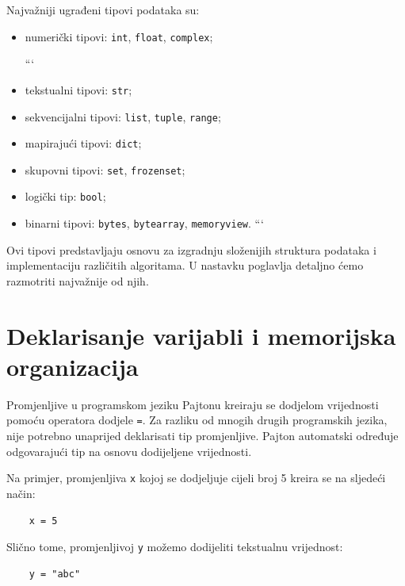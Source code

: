 Najvažniji ugrađeni tipovi podataka su:

\begin{itemize}
	\item numerički tipovi: \texttt{int}, \texttt{float}, \texttt{complex};
	
	```
	\item tekstualni tipovi: \texttt{str};
	
	\item sekvencijalni tipovi: \texttt{list}, \texttt{tuple}, \texttt{range};
	
	\item mapirajući tipovi: \texttt{dict};
	
	\item skupovni tipovi: \texttt{set}, \texttt{frozenset};
	
	\item logički tip: \texttt{bool};
	
	\item binarni tipovi: \texttt{bytes}, \texttt{bytearray}, \texttt{memoryview}.
	```
	
\end{itemize}

Ovi tipovi predstavljaju osnovu za izgradnju složenijih struktura podataka i implementaciju različitih algoritama. U nastavku poglavlja detaljno ćemo razmotriti najvažnije od njih.

\section{Deklarisanje varijabli i memorijska organizacija}

Promjenljive u programskom jeziku Pajtonu kreiraju se dodjelom vrijednosti pomoću operatora dodjele \texttt{=}. Za razliku od mnogih drugih programskih jezika, nije potrebno unaprijed deklarisati tip promjenljive. Pajton automatski određuje odgovarajući tip na osnovu dodijeljene vrijednosti.

Na primjer, promjenljiva \texttt{x} kojoj se dodjeljuje cijeli broj 5 kreira se na sljedeći način:

\begin{verbatim}
	x = 5
\end{verbatim}

Slično tome, promjenljivoj \texttt{y} možemo dodijeliti tekstualnu vrijednost:

\begin{verbatim}
	y = "abc"
\end{verbatim}

